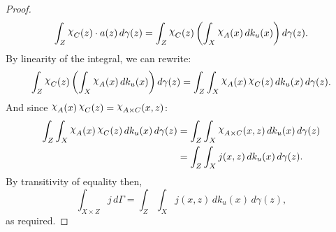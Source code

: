 \documentclass[
twoside=true,
paper=letter,
fontsize=9pt,
pagesize=auto,
leqno,
openany,
headsepline,
overfullrule,
]{scrbook}
\theoremstyle{plain}
\theoremstyle{plain}
\theoremstyle{definition}
\theoremstyle{bfnoteitalic}
\theoremstyle{bfnoteroman}
\newcommand{\charfunction}[1]{\mathop{{\raisebox{2pt}{$\chi$}}_{#1}}}
\newcommand{\funcj}{j}
\newcommand{\funck}{k}
\newcommand{\measurespace}{X}
\newcommand{\measurespaceiii}{Z}
\newcommand{\mspaceelt}{x}
\newcommand{\mspaceeltiii}{z}
\newcommand{\seti}{A}
\newcommand{\setiii}{C}
\newcommand{\uspaceelt}{u}
\newcommand{\measonprod}{\Gamma}%
\newcommand{\marginalthree}{\gamma}
\begin{document}
\begin{proof}
\[
\int_\measurespaceiii
\charfunction{\setiii}(\mspaceeltiii)
\cdot
a(\mspaceeltiii)\, d\marginalthree(\mspaceeltiii)
=
\int_\measurespaceiii
\charfunction{\setiii}(\mspaceeltiii)
\left(\int_\measurespace
\charfunction{\seti} (\mspaceelt)
\, d\funck_\uspaceelt (\mspaceelt)\right)
   d\marginalthree (\mspaceeltiii).
\]
By linearity of the integral, we can rewrite:
\[
\int_\measurespaceiii
\charfunction{\setiii}(\mspaceeltiii)
\left(\int_\measurespace
\charfunction{\seti} (\mspaceelt)
\, d\funck_\uspaceelt (\mspaceelt)\right)
   d\marginalthree (\mspaceeltiii)
=
\int_\measurespaceiii
\int_\measurespace
\charfunction{\seti} (\mspaceelt)
\charfunction{\setiii}(\mspaceeltiii)
\, d\funck_\uspaceelt (\mspaceelt)
\, d\marginalthree (\mspaceeltiii).
\]
And since
$\charfunction{\seti} (\mspaceelt)
\charfunction{\setiii}(\mspaceeltiii)
=
\charfunction{\seti\times\setiii}(\mspaceelt,\mspaceeltiii)$:
\begin{align*}
\int_\measurespaceiii
\int_\measurespace
\charfunction{\seti} (\mspaceelt)
\charfunction{\setiii}(\mspaceeltiii)
\, d\funck_\uspaceelt (\mspaceelt)
\, d\marginalthree (\mspaceeltiii)
& =
\int_\measurespaceiii
\int_\measurespace
\charfunction{\seti\times\setiii}
(\mspaceelt,\mspaceeltiii)
\, d\funck_\uspaceelt (\mspaceelt)
\, d\marginalthree (\mspaceeltiii) \\
& =
\int_\measurespaceiii
\int_\measurespace
\funcj (\mspaceelt,\mspaceeltiii)
\, d\funck_\uspaceelt (\mspaceelt)
\, d\marginalthree (\mspaceeltiii).
\end{align*}
By transitivity of equality then,
\[
\int_{\measurespace\times\measurespaceiii}
\funcj
\, d\measonprod
=
\int_\measurespaceiii
\int_\measurespace
\funcj (\mspaceelt,\mspaceeltiii)
\, d\funck_\uspaceelt (\mspaceelt)
\, d\marginalthree (\mspaceeltiii),
\]
as required.
\end{proof}
\end{document}
